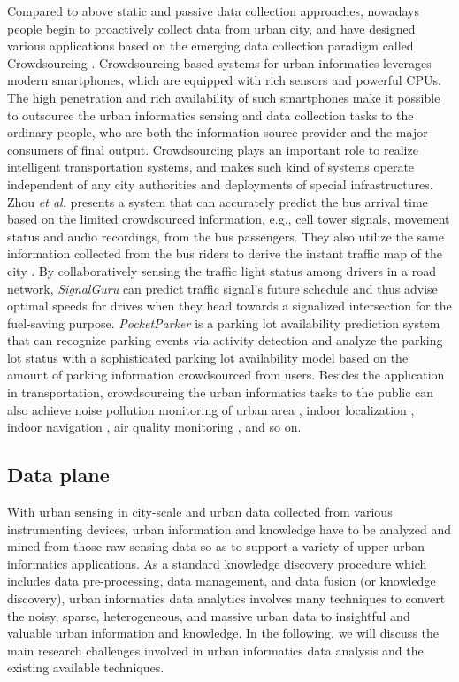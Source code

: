 Compared to above static and passive data collection approaches, nowadays people begin to proactively collect data from urban city, and have designed various applications based on the emerging data collection paradigm called Crowdsourcing \cite{crowdsourcing}. Crowdsourcing based systems for urban informatics leverages modern smartphones, which are equipped with rich sensors and powerful CPUs. The high penetration and rich availability of such smartphones make it possible to outsource the urban informatics sensing and data collection tasks to the ordinary people, who are both the information source provider and the major consumers of final output. Crowdsourcing plays an important role to realize intelligent transportation systems, and makes such kind of systems operate independent of any city authorities and deployments of special infrastructures. Zhou \textit{et al.} \cite{bustime} presents a system that can accurately predict the bus arrival time based on the limited crowdsourced information, e.g., cell tower signals, movement status and audio recordings, from the bus passengers. They also utilize the same information collected from the bus riders to derive the instant traffic map of the city \cite{bustraffic}. By collaboratively sensing the traffic light status among drivers in a road network, \textit{SignalGuru} \cite{signalguru} can predict traffic signal's future schedule and thus advise optimal speeds for drives when they head towards a signalized intersection for the fuel-saving purpose. \textit{PocketParker} \cite{pocketparker} is a parking lot availability prediction system that can recognize parking events via activity detection and analyze the parking lot status with a sophisticated parking lot availability model based on the amount of parking information crowdsourced from users. Besides the application in transportation, crowdsourcing the urban informatics tasks to the public can also achieve noise pollution monitoring of urban area \cite{earphone}, indoor localization \cite{fingerprint}, indoor navigation \cite{travi}, air quality monitoring \cite{air}\cite{uair}, and so on.


\subsection{Data plane}

With urban sensing in city-scale and urban data collected from various instrumenting devices, urban information and knowledge have to be analyzed and mined from those raw sensing data so as to support a variety of upper urban informatics applications. As a standard knowledge discovery procedure which includes data pre-processing, data management, and data fusion (or knowledge discovery), urban informatics data analytics involves many techniques to convert the noisy, sparse, heterogeneous, and massive urban data to insightful and valuable urban information and knowledge. In the following, we will discuss the main research challenges involved in urban informatics data analysis and the existing available techniques.

